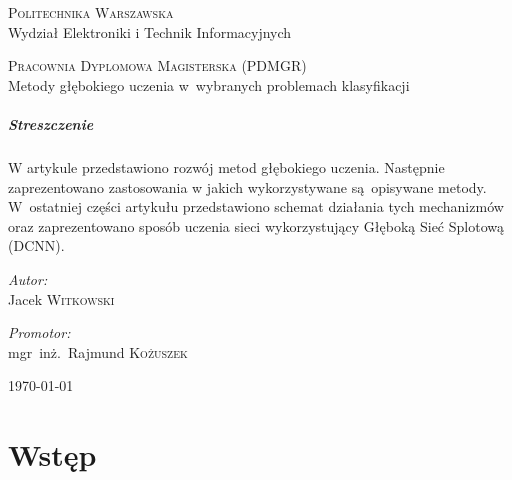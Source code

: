 \documentclass[a4paper,onecolumn,oneside,12pt,wide,floatssmall]{mwrep}
\begin{document}
\begin{titlepage}
  \begin{center}

    \textsc{\Large Politechnika Warszawska}\\[0.1cm]
    \small Wydział Elektroniki i Technik Informacyjnych
    \vfill

    \textsc{\small Pracownia Dyplomowa Magisterska (PDMGR)}\\[0.1cm]
    \Huge Metody głębokiego uczenia w~wybranych problemach klasyfikacji \\[1.5cm]

    \vspace{1cm}
    \begin{minipage}{0.8\textwidth}
    	\paragraph{Streszczenie} \small W artykule przedstawiono rozwój metod głębokiego uczenia. Następnie
    	zaprezentowano zastosowania w jakich wykorzystywane są~opisywane metody. W~ostatniej części artykułu
    	przedstawiono schemat działania tych mechanizmów oraz zaprezentowano sposób uczenia sieci wykorzystujący
    	Głęboką Sieć Splotową (DCNN).
    \end{minipage}
    \vfill

    \begin{minipage}{0.4\textwidth}
      \begin{flushleft} \large
        \emph{Autor:}\\[0.1cm]
        Jacek \textsc{Witkowski}\\
      \end{flushleft}
    \end{minipage}
    \begin{minipage}{0.4\textwidth}
      \begin{flushright} \large
        \emph{Promotor:}\\[0.1cm]
        mgr~inż.~Rajmund \textsc{Kożuszek}\\[1cm]
      \end{flushright}
    \end{minipage}

    \vfill
    {\large \today}

  \end{center}
\end{titlepage}

\tableofcontents

\chapter{Wstęp}
\end{document}

